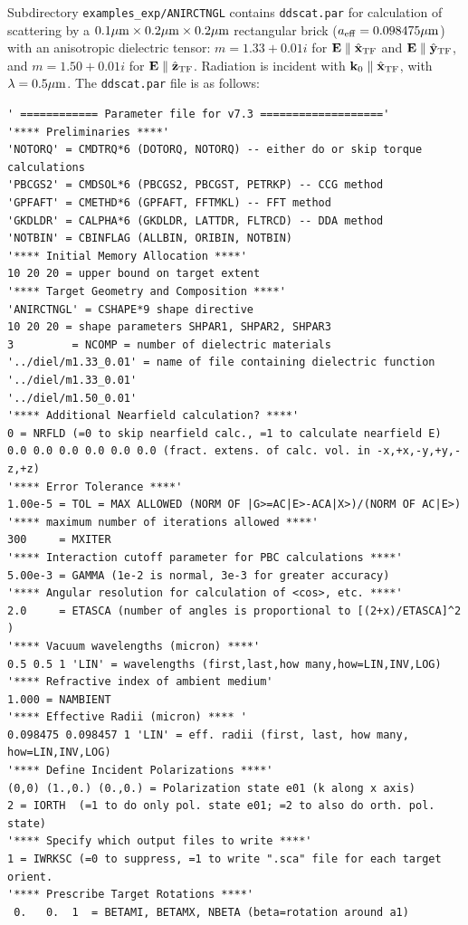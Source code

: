 Subdirectory {\tt examples\_exp/ANIRCTNGL} contains {\tt ddscat.par}
for calculation
of scattering by a $0.1{\mu{\rm m}}\times0.2{\mu{\rm m}}\times0.2{\mu{\rm m}}$ rectangular
brick (${a}_{\rm eff}=0.098475{\mu{\rm m}}$)
with an anisotropic dielectric tensor: $m=1.33+0.01i$ for
${\bf E}\parallel\hat{\bf x}_{\rm TF}$ and ${\bf E}\parallel\hat{\bf y}_{\rm TF}$, and
$m=1.50+0.01i$ for ${\bf E} \parallel \hat{\bf z}_{\rm TF}$.
Radiation is incident with ${\bf k}_0\parallel\hat{\bf x}_{\rm TF}$, with
$\lambda=0.5{\mu{\rm m}}$.
The {\tt ddscat.par} file is as follows:
{\scriptsize
\begin{verbatim}
' ============ Parameter file for v7.3 ==================='
'**** Preliminaries ****'
'NOTORQ' = CMDTRQ*6 (DOTORQ, NOTORQ) -- either do or skip torque calculations
'PBCGS2' = CMDSOL*6 (PBCGS2, PBCGST, PETRKP) -- CCG method
'GPFAFT' = CMETHD*6 (GPFAFT, FFTMKL) -- FFT method
'GKDLDR' = CALPHA*6 (GKDLDR, LATTDR, FLTRCD) -- DDA method
'NOTBIN' = CBINFLAG (ALLBIN, ORIBIN, NOTBIN)
'**** Initial Memory Allocation ****'
10 20 20 = upper bound on target extent
'**** Target Geometry and Composition ****'
'ANIRCTNGL' = CSHAPE*9 shape directive
10 20 20 = shape parameters SHPAR1, SHPAR2, SHPAR3
3         = NCOMP = number of dielectric materials
'../diel/m1.33_0.01' = name of file containing dielectric function
'../diel/m1.33_0.01'
'../diel/m1.50_0.01'
'**** Additional Nearfield calculation? ****'
0 = NRFLD (=0 to skip nearfield calc., =1 to calculate nearfield E)
0.0 0.0 0.0 0.0 0.0 0.0 (fract. extens. of calc. vol. in -x,+x,-y,+y,-z,+z)
'**** Error Tolerance ****'
1.00e-5 = TOL = MAX ALLOWED (NORM OF |G>=AC|E>-ACA|X>)/(NORM OF AC|E>)
'**** maximum number of iterations allowed ****'
300     = MXITER
'**** Interaction cutoff parameter for PBC calculations ****'
5.00e-3 = GAMMA (1e-2 is normal, 3e-3 for greater accuracy)
'**** Angular resolution for calculation of <cos>, etc. ****'
2.0     = ETASCA (number of angles is proportional to [(2+x)/ETASCA]^2 )
'**** Vacuum wavelengths (micron) ****'
0.5 0.5 1 'LIN' = wavelengths (first,last,how many,how=LIN,INV,LOG)
'**** Refractive index of ambient medium'
1.000 = NAMBIENT
'**** Effective Radii (micron) **** '
0.098475 0.098457 1 'LIN' = eff. radii (first, last, how many, how=LIN,INV,LOG)
'**** Define Incident Polarizations ****'
(0,0) (1.,0.) (0.,0.) = Polarization state e01 (k along x axis)
2 = IORTH  (=1 to do only pol. state e01; =2 to also do orth. pol. state)
'**** Specify which output files to write ****'
1 = IWRKSC (=0 to suppress, =1 to write ".sca" file for each target orient.
'**** Prescribe Target Rotations ****'
 0.   0.  1  = BETAMI, BETAMX, NBETA (beta=rotation around a1)

\end{verbatim}}
